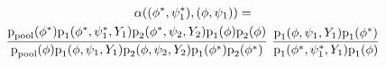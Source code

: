 \begin{multline*}
  \alpha ((\phi^{*}, \psi_{1}^{*}), (\phi, \psi_{1})) = \\ 
  \frac {
    \text{p}_{\text{pool}} (\phi^{*})
    \text{p}_{1}(\phi^{*}, \psi_{1}^{*}, Y_{1})
    \text{p}_{2}(\phi^{*}, \psi_{2}, Y_{2})
    \text{p}_{1}(\phi)
    \text{p}_{2}(\phi)
  } {
    \text{p}_{\text{pool}} (\phi)
    \text{p}_{1}(\phi, \psi_{1}, Y_{1})
    \text{p}_{2}(\phi, \psi_{2}, Y_{2})
    \text{p}_{1}(\phi^{*})
    \text{p}_{2}(\phi^{*})
  } \,\,
  \frac {
    \text{p}_{1}(\phi, \psi_{1}, Y_{1}) \text{p}_{1}(\phi^{*})
  } {
    \text{p}_{1}(\phi^{*}, \psi_{1}^{*}, Y_{1}) \text{p}_{1}(\phi)
  } 
\end{multline*}